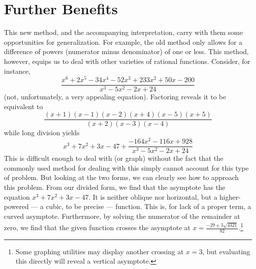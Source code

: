\documentclass[12pt]{article}
\begin{document}
\section{Further Benefits}

This new method, and the accompanying interpretation, carry with
them some opportunities for generalization. For example, the 
old method only allows for a difference of powers (numerator
minus denominator) of one or less. This method, however, equips 
us to deal with other varieties of rational functions. Consider, for 		%
instance,
\begin{equation}
	\frac{x^{6}+2x^{5}-34x^{4}-52x^{3}+233x^{2}+50x-200}{x^{3}-5x^{2}-2x+24}
\end{equation}
(not, unfortunately, a very appealing equation). Factoring reveals it
to be equivalent to 
\begin{equation}
	\frac{(x+1)(x-1)(x-2)(x+4)(x-5)(x+5)}{(x+2)(x-3)(x-4)}
\end{equation}
while long division yields
\begin{equation}
	x^{3}+7x^{2}+3x-47+\frac{-164x^{2}-116x+928}{x^{3}-5x^{2}-2x+24}
\end{equation}
This is difficult enough to deal with (or graph) without the fact that 
the commonly used method for dealing with this simply cannot account 
for this type of problem. But looking at the two forms, we can clearly
see how to approach this problem. From our divided form, we find
that the asymptote has the equation \(x^{3}+7x^{2}+3x-47\). It is 
neither oblique nor horizontal, but a higher-powered --- a cubic, 
to be precise --- function. This is, for lack of a proper term, a 
curved asymptote. Furthermore, by solving the numerator of the 
remainder at zero, we find that the given function crosses the
asymptote at $x=\displaystyle\frac{-29\pm3\sqrt{4321}}{82}$.\footnote{Some
graphing utilities may display another crossing at $x=3$, but evaluating
this directly will reveal a vertical asymptote. }
\end{document}
